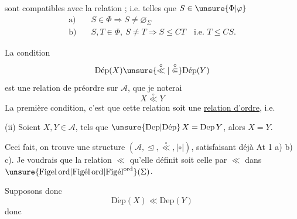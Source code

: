 
sont compatibles avec la relation  ;  i.e. telles que  $S\in\unsure{\Phi|\varphi}$
\[
\begin{aligned}
\text{a)}\quad&S\in\Phi\Longrightarrow S\ne\varnothing_\Sigma\\
\text{b)}\quad&S,T\in\Phi,\ S\ne T\Longrightarrow S\leq CT\quad\text{i.e. }T\leq CS.
\end{aligned}
\]

La condition
\[
\mathrm{D\acute{e}p}(X)\unsure{\overset{\circ}{\ll}|\overset{\circ}{\Subset}}\mathrm{D\acute{e}p}(Y)
\]
est une relation de préordre sur $\mathcal A$, que je noterai
\[
X\overset{\circ}{\ll}Y
\]
La première condition, c'est que cette relation soit une \uline{relation d'ordre}, i.e. 

(ii) Soient $X,Y\in\mathcal A$, tels que $\unsure{\mathrm{Dep}|\mathrm{D\acute{e}p}}\,X=\mathrm{Dep}\,Y$, alors $X=Y$.

Ceci fait, on trouve une structure $(\mathcal A,\trianglelefteq,\overset{\circ}{\ll},\mathrel{|\circ|})$, satisfaisant déjà At 1 a) b) c). Je voudrais que la relation $\ll$ qu'elle définit soit celle   par $\ll$ dans $\unsure{\mathrm{Figel}\,\mathrm{ord}|\mathrm{Fig\acute{e}l}\,\mathrm{ord}|\mathrm{Fig\acute{e}l}^{\mathrm{ord}}}(\Sigma)$.

 Supposons donc 
\[
\mathrm{D\acute{e}p}(X)\ll\mathrm{Dep}(Y)
\]
donc
